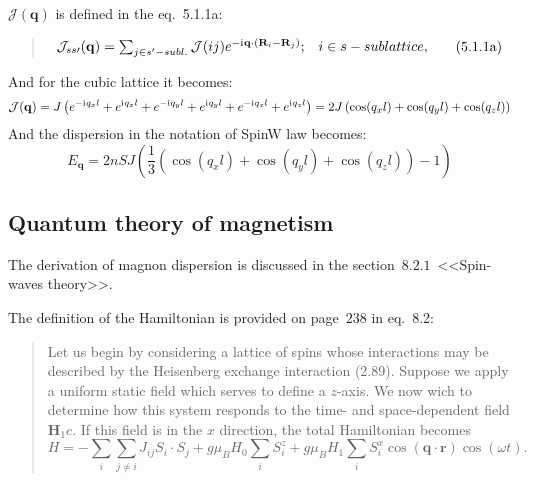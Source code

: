     $\mathcal{J}(\mathbf{q})$ is defined in the eq.~5.1.1a:
    \begin{quote}
        \begin{equation}
            \begin{matrix}
                \mathcal{J}_{ss\prime}(\mathbf{q}) = \sum_{j \in s^{\prime} - subl.} \mathcal{J}(ij)e^{-\mathrm{i}\mkern1mu\mathbf{q}\cdot(\mathbf{R}_i - \mathbf{R}_j)}; & i \in s-sublattice,
            \end{matrix}  
            \label{eq:rem-5.1.1a} \tag{5.1.1a}
        \end{equation}
    \end{quote}
    And for the cubic lattice it becomes:
    \begin{equation}
        \mathcal{J}(\mathbf{q}) = J \left(e^{-\mathrm{i}\mkern1mu q_xl} + e^{\mathrm{i}\mkern1mu q_xl} + e^{-\mathrm{i}\mkern1mu q_yl} + e^{\mathrm{i}\mkern1mu q_yl} + e^{-\mathrm{i}\mkern1mu q_zl} + e^{\mathrm{i}\mkern1mu q_zl}\right) = 
        2J \left(\cos(q_xl) + \cos(q_yl) + \cos(q_zl)\right)
    \end{equation}
    And the dispersion in the notation of SpinW law becomes:
    \begin{equation}
        E_{\mathbf{q}} = 2nSJ\left(\dfrac{1}{3}\left(\cos(q_xl) + \cos(q_yl) + \cos(q_zl)\right) - 1\right)
    \end{equation}
\subsection{Quantum theory of magnetism \cite{white1983quantum}}
    The derivation of magnon dispersion is discussed in the section~$8.2.1$~<<Spin-waves theory>>.

    The definition of the Hamiltonian is provided on page~$238$ in eq.~8.2:

    \begin{quote}
        Let us begin by considering a lattice of spins whose interactions may be described by the Heisenberg exchange interaction (2.89). 
        Suppose we apply a uniform static field which serves to define a $z$-axis. We now wich to determine how
        this system responds to the time- and space-dependent field 
        $\boldsymbol{H}_1c$. 
        If this field is in the $x$ direction, the total Hamiltonian becomes
        \begin{equation}
            H = -\sum_i\sum_{j\ne i} J_{ij}S_i\cdot S_{j} + g \mu_B H_0\sum_i S_i^z + g\mu_B H_1 \sum_i S_i^x\cos(\boldsymbol{q}\cdot\boldsymbol{r})\cos(\omega t).\label{eq:qtom-8.2} \tag{8.2}
        \end{equation}
    \end{quote}
    
